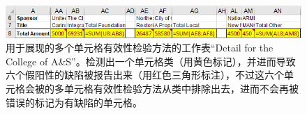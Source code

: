 \begin{figure}[tbp]
    \centering
    \includegraphics[width=\columnwidth]{figure/figure3.png}
    \caption{用于展现\wa 的多个单元格有效性检验方法的工作表``Detail for the College of A\&S''。\cu 检测出一个单元格类（用黄色标记），并进而导致六个假阳性的缺陷被报告出来（用红色三角形标注），不过这六个单元格会被\wa 的多单元格有效性检验方法从类中排除出去，进而不会再被错误的标记为有缺陷的单元格。}
    \label{figure3}
\end{figure}
